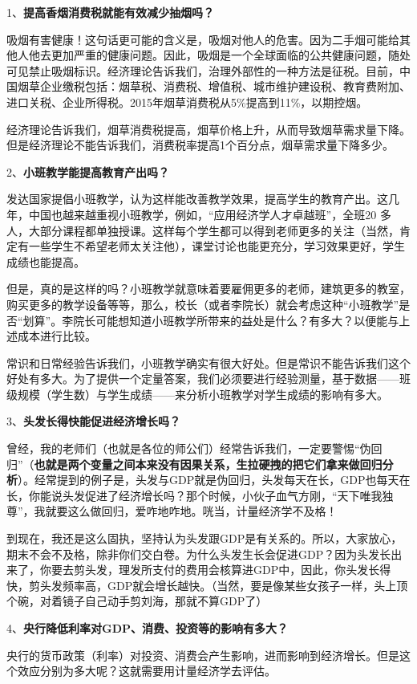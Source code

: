 \documentclass[cn,10pt,math=newtx,citestyle=gb7714-2015,bibstyle=gb7714-2015]{elegantbook}
\begin{document}
	1、\textbf{提高香烟消费税就能有效减少抽烟吗？}
	
	吸烟有害健康！这句话更可能的含义是，吸烟对他人的危害。因为二手烟可能给其他人他去更加严重的健康问题。因此，吸烟是一个全球面临的公共健康问题，随处可见禁止吸烟标识。经济理论告诉我们，治理外部性的一种方法是征税。目前，中国烟草企业缴税包括：烟草税、消费税、增值税、城市维护建设税、教育费附加、进口关税、企业所得税。2015年烟草消费税从5\%提高到11\%，以期控烟。
	
	经济理论告诉我们，烟草消费税提高，烟草价格上升，从而导致烟草需求量下降。但是经济理论不能告诉我们，消费税率提高1个百分点，烟草需求量下降多少。
	
	2、\textbf{小班教学能提高教育产出吗？}
	
	发达国家提倡小班教学，认为这样能改善教学效果，提高学生的教育产出。这几年，中国也越来越重视小班教学，例如，“应用经济学人才卓越班”，全班20 多人，大部分课程都单独授课。这样每个学生都可以得到老师更多的关注（当然，肯定有一些学生不希望老师太关注他），课堂讨论也能更充分，学习效果更好，学生成绩也能提高。
	
	但是，真的是这样的吗？小班教学就意味着要雇佣更多的老师，建筑更多的教室，购买更多的教学设备等等，那么，校长（或者李院长）就会考虑这种“小班教学”是否“划算”。李院长可能想知道小班教学所带来的益处是什么？有多大？以便能与上述成本进行比较。
	
	常识和日常经验告诉我们，小班教学确实有很大好处。但是常识不能告诉我们这个好处有多大。为了提供一个定量答案，我们必须要进行经验测量，基于数据——班级规模（学生数）与学生成绩——来分析小班教学对学生成绩的影响有多大。
	
	3、\textbf{头发长得快能促进经济增长吗？}
	
	曾经，我的老师们（也就是各位的师公们）经常告诉我们，一定要警惕“伪回归”（\textbf{也就是两个变量之间本来没有因果关系，生拉硬拽的把它们拿来做回归分析}）。经常提到的例子是，头发与GDP就是伪回归，头发每天在长，GDP也每天在长，你能说头发促进了经济增长吗？那个时候，小伙子血气方刚，“天下唯我独尊”，我就要这么做回归，爱咋地咋地。咣当，计量经济学不及格！
	
	到现在，我还是这么固执，坚持认为头发跟GDP是有关系的。所以，大家放心，期末不会不及格，除非你们交白卷。为什么头发生长会促进GDP？因为头发长出来了，你要去剪头发，理发所支付的费用会核算进GDP中，因此，你头发长得快，剪头发频率高，GDP就会增长越快。（当然，要是像某些女孩子一样，头上顶个碗，对着镜子自己动手剪刘海，那就不算GDP了）
	
	4、\textbf{央行降低利率对GDP、消费、投资等的影响有多大？}
	
	央行的货币政策（利率）对投资、消费会产生影响，进而影响到经济增长。但是这个效应分别为多大呢？这就需要用计量经济学去评估。
	
\end{document}
